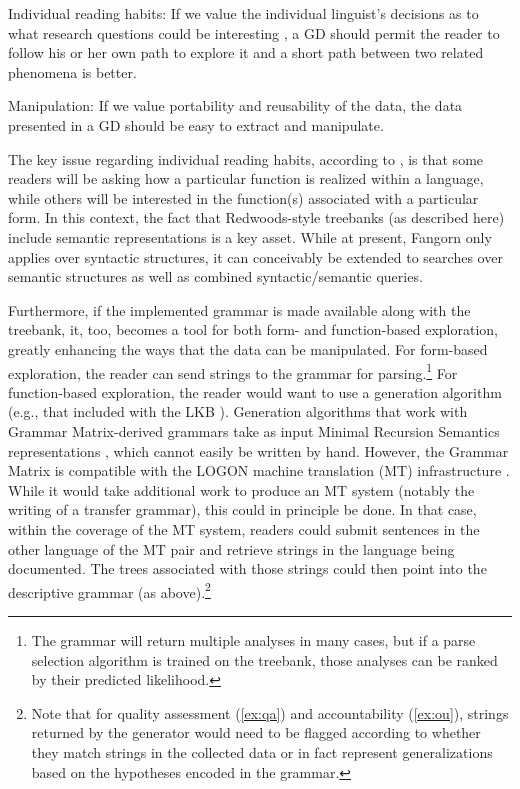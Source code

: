 \documentclass[12pt]{article}
\begin{document}
\begin{exe}
\ex\label{ex:ff} {\sc Individual reading habits:} If we value the individual
linguist's decisions as to what research questions could be
interesting \cite[402]{Rice:06}, a GD should permit the reader to
follow his or her own path to explore it and a short path between
two related phenomena is better.
\end{exe}

\begin{exe}
\ex\label{ex:mn} {\sc Manipulation:} If we value portability and reusability of
the data, the data presented in a GD should be easy to extract and
manipulate.
\end{exe}


The key issue regarding individual reading habits, according to
, is that some readers will be asking how a
particular function is realized within a language, while others will
be interested in the function(s) associated with a particular form.
In this context, the fact that Redwoods-style treebanks (as described
here) include semantic representations is a key asset.  While at
present, Fangorn only applies over syntactic structures, it
can conceivably be extended to searches over semantic structures as
well as combined syntactic/semantic queries.  

Furthermore, if the implemented grammar is made available along with the
treebank, it, too, becomes a tool for both form- and function-based
exploration, greatly enhancing the ways that the data can be
manipulated.  For form-based exploration, the reader can send strings to
the grammar for parsing.\footnote{The grammar will return multiple
  analyses in many cases, but if a parse selection algorithm
  is trained on the treebank, those analyses can be ranked
  by their predicted likelihood.}  For function-based exploration, the
reader would want to use a generation algorithm (e.g., that included
with the LKB \cite{Car:Cop:Fli:99}).  Generation algorithms that
work with Grammar Matrix-derived grammars take as input Minimal
Recursion Semantics representations \cite{Cop:Fli:Pol:Sag:05}, which
cannot easily be written by hand.  However, the Grammar Matrix is
compatible with the LOGON machine translation (MT) infrastructure
\cite{Lon:Oep:Ber:04}.  While it would take additional work to produce
an MT system (notably the writing of a transfer grammar), this could in
principle be done.  In that case, within the coverage of the MT system,
readers could submit sentences in the other language of the MT pair and
retrieve strings in the language being documented.  The trees associated
with those strings could then point into the descriptive grammar (as
above).\footnote{Note that for {\sc quality assessment} (\ref{ex:qa})
  and {\sc accountability} (\ref{ex:ou}), strings returned by the
  generator would need to be flagged according to whether they match
  strings in the collected data or in fact represent generalizations
  based on the hypotheses encoded in the grammar.}
\end{document}
